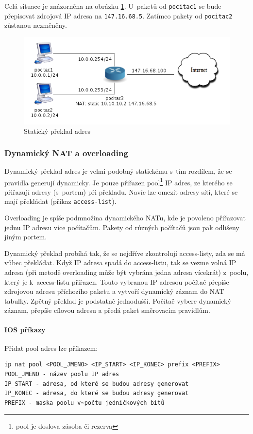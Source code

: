 Celá situace je znázorněna na obrázku \ref{fig:nat1}. U~paketů od \verb|pocitac1| se bude přepisovat zdrojová IP adresa na \verb|147.16.68.5|. Zatímco pakety od \verb|pocitac2| zůstanou nezměněny.

\begin{figure}[h]
\begin{center}
\includegraphics[width=12cm]{figures/nat1}
\caption{Statický překlad adres}
\label{fig:nat1}
\end{center}
\end{figure}

\newpage


\subsubsection{Dynamický NAT a overloading}
Dynamický překlad adres je velmi podobný statickému s~tím rozdílem, že se pravidla generují dynamicky. Je pouze přiřazen pool\footnote{pool je doslova zásoba či rezerva} IP adres, ze kterého se přiřazují adresy (s~portem) při překladu. Navíc lze omezit adresy sítí, které se mají překládat (příkaz \verb|access-list|).

Overloading je spíše podmnožina dynamického NATu, kde je povoleno přiřazovat jednu IP adresu více počítačům. Pakety od různých počítačů jsou pak odlišeny jiným portem.

Dynamický překlad probíhá tak, že se nejdříve zkontrolují access-listy, zda se má vůbec překládat. Když IP adresa spadá do access-listu, tak se vezme volná IP adresa (při metodě overloading může být vybrána jedna adresa vícekrát) z~poolu, který je k~access-listu přiřazen. Touto vybranou IP adresou počítač přepíše zdrojovou adresu příchozího paketu a vytvoří dynamický záznam do NAT tabulky. Zpětný překlad je podstatně jednodušší. Počítač vybere dynamický záznam, přepíše cílovou adresu a předá paket směrovacím pravidlům.

\paragraph{IOS příkazy}
Přidat pool adres lze příkazem:
\begin{verbatim}
ip nat pool <POOL_JMENO> <IP_START> <IP_KONEC> prefix <PREFIX>
POOL_JMENO - název poolu IP adres
IP_START - adresa, od které se budou adresy generovat
IP_KONEC - adresa, do které se budou adresy generovat
PREFIX - maska poolu v~počtu jedničkových bitů
\end{verbatim} 

